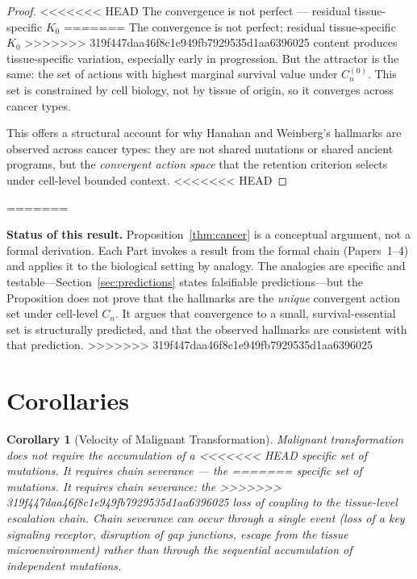 \documentclass[11pt]{article}
\newtheorem{corollary}[theorem]{Corollary}
\theoremstyle{definition}
\theoremstyle{remark}
\begin{document}
\begin{proof}
<<<<<<< HEAD
The convergence is not perfect --- residual tissue-specific $K_0$
=======
The convergence is not perfect; residual tissue-specific $K_0$
>>>>>>> 319f447daa46f8c1e949fb7929535d1aa6396025
content produces tissue-specific variation, especially early in
progression. But the attractor is the same: the set of actions with
highest marginal survival value under $C_n^{(0)}$. This set is
constrained by cell biology, not by tissue of origin, so it
converges across cancer types.

This offers a structural account for why Hanahan and Weinberg's
hallmarks \cite{Hanahan2011} are observed across cancer types: they
are not shared mutations or shared ancient programs, but the
\emph{convergent action space} that the retention criterion selects
under cell-level bounded context.
<<<<<<< HEAD
\end{proof}
=======
\medskip

\textbf{Status of this result.} Proposition~\ref{thm:cancer} is a
conceptual argument, not a formal derivation. Each Part invokes a
result from the formal chain (Papers~1--4) and applies it to the
biological setting by analogy. The analogies are specific and
testable---Section~\ref{sec:predictions} states falsifiable
predictions---but the Proposition does not prove that the hallmarks
are the \emph{unique} convergent action set under cell-level $C_n$.
It argues that convergence to a small, survival-essential set is
structurally predicted, and that the observed hallmarks are consistent
with that prediction.
>>>>>>> 319f447daa46f8c1e949fb7929535d1aa6396025

\section{Corollaries}
\label{sec:corollaries}

\begin{corollary}[Velocity of Malignant Transformation]
\label{cor:velocity}
Malignant transformation does not require the accumulation of a
<<<<<<< HEAD
specific set of mutations. It requires chain severance --- the
=======
specific set of mutations. It requires chain severance: the
>>>>>>> 319f447daa46f8c1e949fb7929535d1aa6396025
loss of coupling to the tissue-level escalation chain. Chain
severance can occur through a single event (loss of a key signaling
receptor, disruption of gap junctions, escape from the tissue
microenvironment) rather than through the sequential accumulation
of independent mutations.
\end{corollary}
\end{document}
